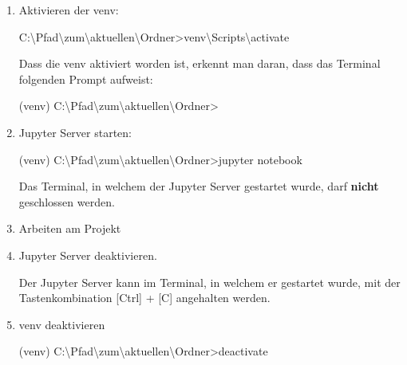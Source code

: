 \documentclass[
  nswissgerman,
  a4paper,
  DIV=11,
  numbers=noendperiod,
  ngerman]{scrreprt}
\newenvironment{Shaded}{\begin{snugshade}}{\end{snugshade}}
\newcommand{\NormalTok}[1]{\textcolor[rgb]{0.00,0.23,0.31}{#1}}
\begin{document}
\begin{enumerate}
\def\labelenumi{\arabic{enumi}.}
\item
  Aktivieren der venv:

\begin{Shaded}
\begin{Highlighting}[numbers=left,,]
\NormalTok{C:\textbackslash{}Pfad\textbackslash{}zum\textbackslash{}aktuellen\textbackslash{}Ordner\textgreater{}venv\textbackslash{}Scripts\textbackslash{}activate}
\end{Highlighting}
\end{Shaded}

  Dass die venv aktiviert worden ist, erkennt man daran, dass das
  Terminal folgenden Prompt aufweist:

\begin{Shaded}
\begin{Highlighting}[numbers=left,,]
\NormalTok{(venv) C:\textbackslash{}Pfad\textbackslash{}zum\textbackslash{}aktuellen\textbackslash{}Ordner\textgreater{}}
\end{Highlighting}
\end{Shaded}
\item
  Jupyter Server starten:

\begin{Shaded}
\begin{Highlighting}[numbers=left,,]
\NormalTok{(venv) C:\textbackslash{}Pfad\textbackslash{}zum\textbackslash{}aktuellen\textbackslash{}Ordner\textgreater{}jupyter notebook}
\end{Highlighting}
\end{Shaded}

  Das Terminal, in welchem der Jupyter Server gestartet wurde, darf
  \textbf{nicht} geschlossen werden.
\item
  Arbeiten am Projekt
\item
  Jupyter Server deaktivieren.

  Der Jupyter Server kann im Terminal, in welchem er gestartet wurde,
  mit der Tastenkombination {[}Ctrl{]} + {[}C{]} angehalten werden.
\item
  venv deaktivieren

\begin{Shaded}
\begin{Highlighting}[numbers=left,,]
\NormalTok{(venv) C:\textbackslash{}Pfad\textbackslash{}zum\textbackslash{}aktuellen\textbackslash{}Ordner\textgreater{}deactivate}
\end{Highlighting}
\end{Shaded}
\end{enumerate}
\end{document}
